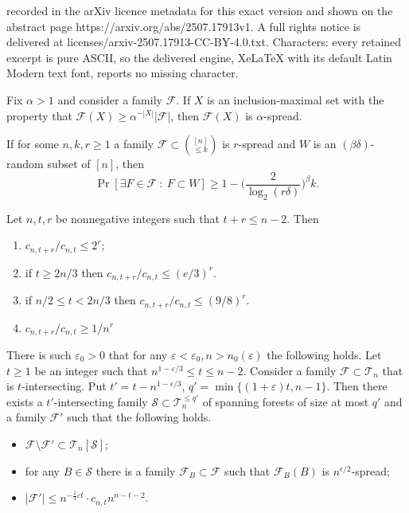 \documentclass[10pt,a4paper]{amsart}
\newcommand{\T}{\mathcal{T}}
\newcommand{\eps}{\varepsilon}
\newcommand{\ff}{\mathcal{F}}
\newcommand{\s}{\mathcal{S}}
\renewcommand{\ge}{\geqslant}
\renewcommand{\le}{\leqslant}
\begin{document}
recorded in the arXiv licence metadata for this exact version and shown on the abstract page https://arxiv.org/abs/2507.17913v1. A full rights notice is delivered at licenses/arxiv-2507.17913-CC-BY-4.0.txt. Characters: every retained excerpt is pure ASCII, so the delivered engine, XeLaTeX with its default Latin Modern text font, reports no missing character.
\begin{observation}\label{obs_spread_2}
  Fix $\alpha>1$ and consider a family $\ff$. If $X$ is an inclusion-maximal set with the property that $\ff(X) \ge \alpha^{-|X|}|\ff|$, then $\ff(X)$ is $\alpha$-spread.
\end{observation}

\begin{theorem}\label{spread_lemma}
  If for some $n,k,r\ge 1$ a family $\ff\subset {[n]\choose \le k}$ is $r$-spread and $W$ is an $(\beta\delta)$-random subset of $[n]$, then $$\Pr[\exists F\in \ff\ :\ F\subset W]\ge 1-\Big(\frac 2{\log_2(r\delta)} \Big)^\beta k.$$
\end{theorem}

\begin{lemma}\label{cnt_relative}
    Let $n,t, r$ be nonnegative integers such that $t + r\le n - 2$. Then 
    \begin{enumerate}[label=(\roman*)]
        \item $c_{n, t+r}/c_{n, t} \le 2^r$;
        \item if $t \ge 2n/3$ then $c_{n, t+r}/c_{n, t} \le (e/3)^r$.
        \item if $n/2 \le t < 2n/3$ then $c_{n, t+r}/c_{n, t} \le (9/8)^r$.
        \item $c_{n, t+r}/c_{n, t} \ge 1/n^r$
    \end{enumerate}
\end{lemma}

\begin{theorem}\label{1SA}
  There is such $\eps_0 > 0$ that for any $\eps < \eps_0, n > n_0(\eps)$ the following holds. Let $t\ge1$ be an integer such that $n^{1-\eps/3} \le t \le n- 2$. Consider a family $\ff\subset \T_n$ that is $t$-intersecting.
  Put $t'= t-n^{1-\epsilon/3}$, $q' = \min\{(1 + \eps)t, n-1\}$. Then there exists a  $t'$-intersecting family $\mathcal S\subset \T_n^{\le q'}$ of spanning forests of size at most $q'$ and a family $\ff'$ such that the following holds.
  \begin{itemize}
    \item[(i)] $\ff\setminus \ff'\subset \T_n[\s]$;
    \item[(ii)] for any $B\in \s$ there is a family $\ff_B\subset \ff$ such that $\ff_B(B)$ is $n^{\epsilon/2}$-spread;
    \item[(iii)] $|\ff'|\le n^{-\frac 13\eps t}\cdot c_{n, t}n^{n-t-2}$.
  \end{itemize}
\end{theorem}
\end{document}
